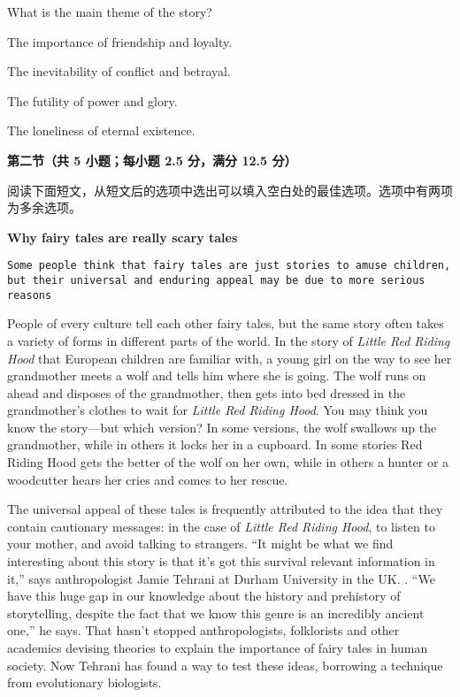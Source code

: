 \documentclass{exam-zh}
\begin{document}
\begin{question}
  What is the main theme of the story?
  \begin{choices}
  \item The importance of friendship and loyalty.
  \item The inevitability of conflict and betrayal.
  \item The futility of power and glory.
  \item The loneliness of eternal existence.
  \end{choices}
\end{question}

\begin{flushleft}
  {\bfseries 第二节（共 5 小题；每小题 2.5 分，满分 12.5 分）}
\end{flushleft}

阅读下面短文，从短文后的选项中选出可以填入空白处的最佳选项。选项中有两项为多余选项。

{\centering \bfseries Why fairy tales are really scary tales \par}

\begin{center}
  \texttt{Some people think that fairy tales are just stories to amuse children, but their universal and enduring appeal may be due to more serious reasons}
\end{center}

People of every culture tell each other fairy tales, but the same story often takes a variety of forms in different parts of the world. In the story of \textit{Little Red Riding Hood} that European children are familiar with, a young girl on the way to see her grandmother meets a wolf and tells him where she is going. The wolf runs on ahead and disposes of the grandmother, then gets into bed dressed in the grandmother's clothes to wait for \textit{Little Red Riding Hood}. You may think you know the story—but which version? In some versions, the wolf swallows up the grandmother, while in others it locks her in a cupboard. In some stories Red Riding Hood gets the better of the wolf on her own, while in others a hunter or a woodcutter hears her cries and comes to her rescue.

The universal appeal of these tales is frequently attributed to the idea that they contain cautionary messages: in the case of \textit{Little Red Riding Hood}, to listen to your mother, and avoid talking to strangers. ``It might be what we find interesting about this story is that it's got this survival relevant information in it,'' says anthropologist Jamie Tehrani at Durham University in the UK. \fillin[A]. ``We have this huge gap in our knowledge about the history and prehistory of storytelling, despite the fact that we know this genre is an incredibly ancient one,'' he says. That hasn't stopped anthropologists, folklorists and other academics devising theories to explain the importance of fairy tales in human society. Now Tehrani has found a way to test these ideas, borrowing a technique from evolutionary biologists.
\end{document}
